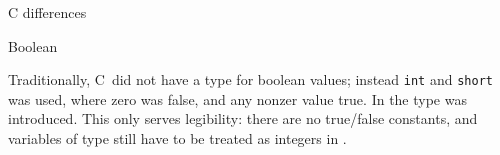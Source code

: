\begin{comment}
  \Level 1 {Number values and undefined values}

  A computer allocates a fixed amount of space for integers and floating
  point numbers, typically 4 or 8 bytes. That means that not all numbers
  are representable.
  \begin{itemize}
  \item Using 4 bytes, that is 32 bits, we can represent $2^{32}$
    integers. Typically this is the range $-2^{31}\ldots 0 \ldots
    2^{31}-1$.
  \item Floating point numbers are representated by a sign bit, an
    exponent, and a number of significant digits.
    For 4-byte numbers, the number of significant (decimal) digits is
    around~6; for 8-byte numbers it is around 15.
  \end{itemize}

  If you compute a number that `fall in between the gaps' of the
  representable numbers, it gets truncated or rounded. The effects of
  this on your computation constitute its own field of numerical
  mathematics, called \indexterm{roundoff error analysis}.

  If a number goes outside the bounds of what is representable, it
  becomes either:
  \begin{itemize}
  \item \indextermtt{Inf}: infinity. This happens if you add or multiply
    enough large numbers together. There is of course also a value
    \n{-}\indextermtt{Inf}. Or:
  \item \indextermtt{NaN}: not a number. This happens if you subtract
    one \lstinline{Inf} from another, or do things such as taking the
    root of a negative number.
  \end{itemize}
  Your program will not be interrupted if a \lstinline{NaN} or \lstinline{Inf} is
  generated: the computation will merrily (and at full speed) progress
  with these numbers. See section~\ref{sec:limits} for detection of such quantities.

  Some people advocate filling uninitialized memory with such illegal
  values, to make it recognizable as such.
\end{comment}

 {C differences}

 {Boolean}

Traditionally, C~did not have a type for boolean values;
instead \lstinline{int} and \lstinline{short} was used,
where zero was false, and any nonzer value true.
In  the type  was introduced.
This only serves legibility: there are no true/false constants,
and variables of type  still have to be treated as
integers in .

